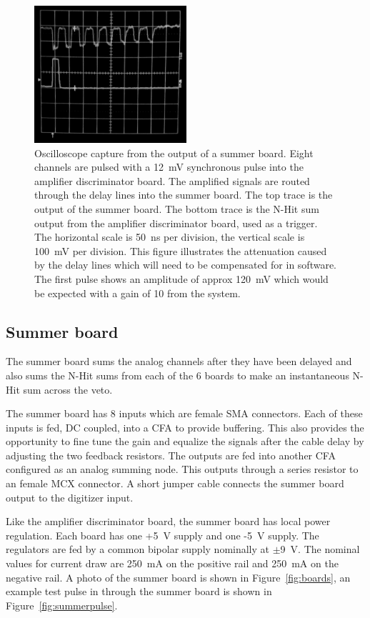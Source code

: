 \documentclass[review,number,sort&compress]{elsarticle}
\begin{document}
\begin{figure}[ht]
\begin{center}
	\includegraphics[height=2in, keepaspectratio=true]{graphics/delaypulse_bw.jpg}
	\caption{Oscilloscope capture from the output of a summer board. Eight channels are
		pulsed with a 12~mV synchronous pulse into the amplifier discriminator board. The amplified
		signals are routed through the delay lines into the summer board. The top trace is
		the output of the summer board. The bottom trace is the N-Hit sum output from the
		amplifier discriminator board, used as a trigger. The horizontal scale is 50~ns per division,
		the vertical scale is 100~mV per division. This figure illustrates the attenuation caused by the delay
		lines which will need to be compensated for in software. The first pulse shows an amplitude of approx 120~mV which would be expected with a gain of 10 from the system.
\label{fig:multipulse}}
\end{center}
\end{figure}

\subsection{Summer board}
\label{sec:Sum}
%
The summer board sums the analog channels after they have been delayed
and also sums the N-Hit sums from each of the 6 boards to make an
instantaneous N-Hit sum across the veto. 

The summer board has 8 inputs which are female SMA connectors. Each of
these inputs is fed, DC coupled, into a CFA to provide buffering. This
also provides the opportunity to fine tune the gain and equalize the
signals after the cable delay by adjusting the two feedback resistors.
The outputs are fed into another CFA configured as an analog summing
node. This outputs through a series resistor to an female MCX
connector. A short jumper cable connects the summer board output to
the digitizer input.  

Like the amplifier discriminator board, the summer board has local
power regulation.  Each board has one +5~V supply and one -5~V supply.
The regulators are fed by a common bipolar supply nominally at
$\pm$9~V.  The nominal values for current draw are 250~mA on the
positive rail and 250~mA on the negative rail.  A photo of the summer
board is shown in Figure~\ref{fig:boards}, an example test pulse in
through the summer board is shown in Figure~\ref{fig:summerpulse}.
\end{document}
